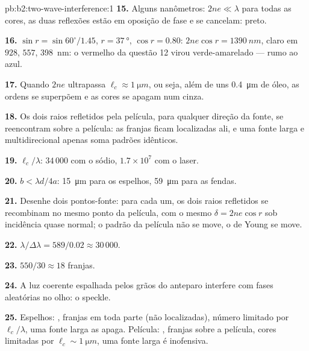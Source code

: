 \begin{solution}{pb:b2:two-wave-interference:1}
\textbf{15.} Alguns nanômetros: $2ne \ll \lambda$ para todas as cores, as duas
reflexões estão em oposição de fase e se cancelam: preto.

\textbf{16.} $\sin r = \sin60^\circ/1.45$, $r = \qty{37}{\degree}$, $\cos r = 0.80$: $2ne\cos r
= \qty{1390}{nm}$, claro em $928$, $557$, \qty{398}{nm}: o vermelho da questão 12
virou verde-amarelado --- rumo ao azul.

\textbf{17.} Quando $2ne$ ultrapassa $\ell_c \approx \qty{1}{\micro m}$, ou seja, além de uns
\qty{0.4}{\micro m} de óleo, as ordens se superpõem e as cores se apagam num cinza.

\textbf{18.} Os dois raios refletidos pela película, para qualquer direção
da fonte, se reencontram sobre a película: as franjas ficam localizadas ali, e
uma fonte larga e multidirecional apenas soma padrões idênticos.

\textbf{19.} $\ell_c/\lambda$: $34\,000$ com o sódio, $1.7 \times 10^7$ com o laser.

\textbf{20.} $b < \lambda d/4a$: \qty{15}{\micro m} para os espelhos, \qty{59}{\micro m} para
as fendas.

\textbf{21.} Desenhe dois pontos-fonte: para cada um, os dois raios refletidos
se recombinam no mesmo ponto da película, com o mesmo $\delta = 2ne\cos r$
sob incidência quase normal; o padrão da película não se move, o de Young
se move.

\textbf{22.} $\lambda/\Delta\lambda = 589/0.02 \approx 30\,000$.

\textbf{23.} $550/30 \approx 18$ franjas.

\textbf{24.} A luz coerente espalhada pelos grãos do anteparo interfere
com fases aleatórias no olho: o speckle.

\textbf{25.} Espelhos: , franjas em toda parte
(não localizadas), número limitado por $\ell_c/\lambda$, uma fonte larga as
apaga. Película: , franjas sobre a película, cores
limitadas por $\ell_c \sim \qty{1}{\micro m}$, uma fonte larga é inofensiva.
\end{solution}
